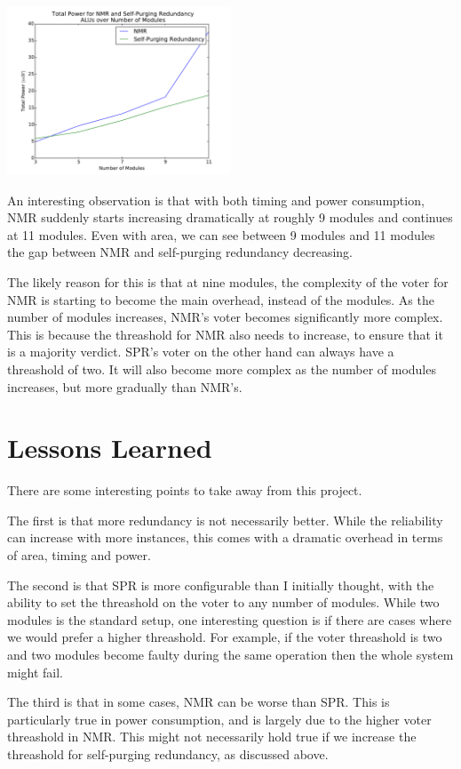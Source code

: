 \documentclass[a4paper,12pt]{article}
\begin{document}
    \includegraphics[width=0.5\textwidth]{power_nmr}

    An interesting observation is that with both timing and power consumption, NMR suddenly starts increasing dramatically at roughly 9 modules and continues at 11 modules. Even with area, we can see between 9 modules and 11 modules the gap between NMR and self-purging redundancy decreasing.

    The likely reason for this is that at nine modules, the complexity of the voter for NMR is starting to become the main overhead, instead of the modules. As the number of modules increases, NMR's voter becomes significantly more complex. This is because the threashold for NMR also needs to increase, to ensure that it is a majority verdict. SPR's voter on the other hand can always have a threashold of two. It will also become more complex as the number of modules increases, but more gradually than NMR's.

    \section{Lessons Learned}
    There are some interesting points to take away from this project.

    The first is that more redundancy is not necessarily better. While the reliability can increase with more instances, this comes with a dramatic overhead in terms of area, timing and power.

    The second is that SPR is more configurable than I initially thought, with the ability to set the threashold on the voter to any number of modules. While two modules is the standard setup, one interesting question is if there are cases where we would prefer a higher threashold. For example, if the voter threashold is two and two modules become faulty during the same operation then the whole system might fail.

    The third is that in some cases, NMR can be worse than SPR. This is particularly true in power consumption, and is largely due to the higher voter threashold in NMR. This might not necessarily hold true if we increase the threashold for self-purging redundancy, as discussed above.
\end{document}
